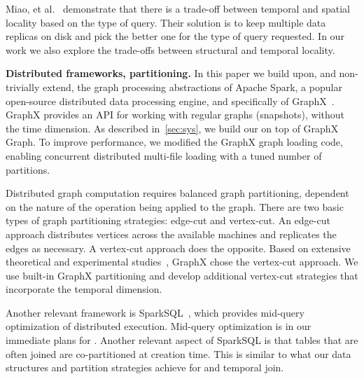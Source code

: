 Miao, et al.~\cite{DBLP:journals/tos/MiaoHLWYZPCC15} demonstrate that
there is a trade-off between temporal and spatial locality based on the
type of query.  Their solution is to keep multiple data replicas on
disk and pick the better one for the type of query requested.  In our
work we also explore the trade-offs between structural and temporal
locality.  

{\bf Distributed frameworks, partitioning.}  In this paper we build
upon, and non-trivially extend, the graph processing abstractions of
Apache Spark, a popular open-source distributed data processing
engine, and specifically of
GraphX~\cite{DBLP:conf/osdi/GonzalezXDCFS14}.  GraphX provides an API
for working with regular graphs (snapshots), without the time
dimension.  As described in~\ref{sec:sys}, we build our \tgs on top
of GraphX Graph.  To improve performance, we modified the GraphX graph
loading code, enabling concurrent distributed multi-file loading with
a tuned number of partitions.  

Distributed graph computation requires balanced graph partitioning,
dependent on the nature of the operation being applied to the graph.
There are two basic types of graph partitioning strategies: edge-cut
and vertex-cut.  An edge-cut approach distributes vertices across the
available machines and replicates the edges as necessary.  A
vertex-cut approach does the opposite.  Based on extensive theoretical
and experimental studies~\cite{Gonzalez2012}, GraphX chose the
vertex-cut approach.  We use built-in GraphX partitioning and develop
additional vertex-cut strategies that incorporate the temporal
dimension.

Another relevant framework is SparkSQL~\cite{Xin2013}, which provides
mid-query optimization of distributed execution.  Mid-query
optimization is in our immediate plans for \ql.  Another relevant
aspect of SparkSQL is that tables that are often joined are
co-partitioned at creation time.  This is similar to what our data
structures and partition strategies achieve for  and
temporal join.


